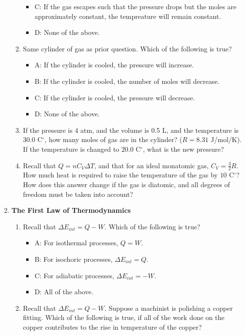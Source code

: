 \documentclass[10pt]{article}
\begin{document}
\begin{enumerate}
\begin{enumerate}
\begin{itemize}
\item C: If the gas escapes such that the pressure drops but the moles are approximately constant, the tempreature will remain constant.
\item D: None of the above.
\end{itemize}
\item Same cylinder of gas as prior question.  Which of the following is true?
\begin{itemize}
\item A: If the cylinder is cooled, the pressure will increase.
\item B: If the cylinder is cooled, the number of moles will decrease.
\item C: If the cylinder is cooled, the pressure will decrease.
\item D: None of the above.
\end{itemize}
\item If the pressure is 4 atm, and the volume is 0.5 L, and the temperature is $30.0$ C$^{\circ}$, how many moles of gas are in the cylinder?  ($R = 8.31$ J/mol/K).  If the temperature is changed to $20.0$ C$^{\circ}$, what is the new pressure? \\ \vspace{3cm}
\item Recall that $Q = n C_V \Delta T$, and that for an ideal monatomic gas, $C_V = \frac{3}{2}R$.  How much heat is required to raise the temperature of the gas by $10$ C$^{\circ}$?  How does this answer change if the gas is diatomic, and all degrees of freedom must be taken into account? \\ \vspace{3cm}
\end{enumerate}
\item \textbf{The First Law of Thermodynamics}
\begin{enumerate}
\item Recall that $\Delta E_{int} = Q - W$.  Which of the following is true?
\begin{itemize}
\item A: For isothermal processes, $Q = W$.
\item B: For isochoric processes, $\Delta E_{int} = Q$.
\item C: For adiabatic processes, $\Delta E_{int} = -W$.
\item D: All of the above.
\end{itemize}
\item Recall that $\Delta E_{int} = Q - W$.  Suppose a machinist is polishing a copper fitting.  Which of the following is true, if all of the work done on the copper contributes to the rise in temperature of the copper?

\end{enumerate}
\end{enumerate}
\end{document}
